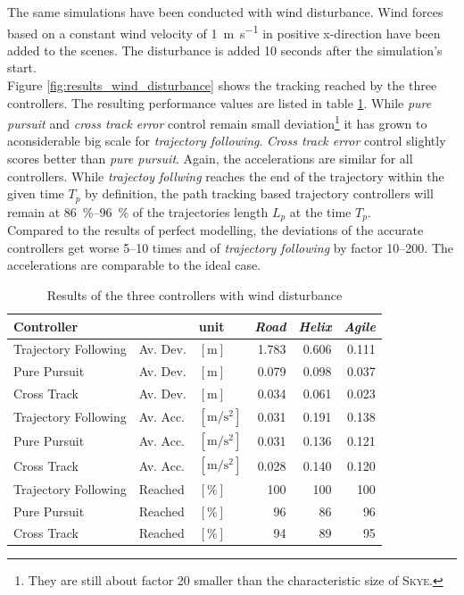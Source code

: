 The same simulations have been conducted with wind disturbance. Wind forces based on a constant wind velocity of \SI{1}{\meter\per\second} in positive x-direction have been added to the scenes. The disturbance is added 10 seconds after the simulation's start. \\
Figure \ref{fig:results_wind_disturbance} shows the tracking reached by the three controllers. The resulting performance values are listed in table \ref{tab:results_wind_disturbance}. While \textit{pure pursuit} and \textit{cross track error} control remain small deviation\footnote{They are still about factor 20 smaller than the characteristic size of \textsc{Skye}.} it has grown to aconsiderable big scale for \textit{trajectory following}. \textit{Cross track error} control slightly scores better than \textit{pure pursuit}. Again, the accelerations are similar for all controllers. While \textit{trajectoy follwing} reaches the end of the trajectory within the given time $T_p$ by definition, the path tracking based trajectory controllers will remain at \SIrange{86}{96}{\percent} of the trajectories length $L_p$ at the time $T_p$. \\
Compared to the results of perfect modelling, the deviations of the accurate controllers get worse \numrange{5}{10} times and of \textit{trajectory following} by factor \numrange{10}{200}. The accelerations are comparable to the ideal case. 

\begin{table}[h]
\begin{center}
 \begin{tabular}{lll|rrr}
 \hline
 Controller &   & unit & \textit{Road} & \textit{Helix} & \textit{Agile} \\ \hline \hline
 Trajectory Following & Av. Dev. & $[\si{\meter}]$ & 1.783 & 0.606 & 0.111 \\
 Pure Pursuit         & Av. Dev. & $[\si{\meter}]$ & 0.079 & 0.098 & 0.037 \\
 Cross Track          & Av. Dev. & $[\si{\meter}]$ & 0.034 & 0.061 & 0.023 \\

 Trajectory Following & Av. Acc. & $[\si{\meter\per\square\second}]$ & 0.031 & 0.191 & 0.138 \\
 Pure Pursuit         & Av. Acc. & $[\si{\meter\per\square\second}]$ & 0.031 & 0.136 & 0.121 \\
 Cross Track          & Av. Acc. & $[\si{\meter\per\square\second}]$ & 0.028 & 0.140 & 0.120 \\
 
 Trajectory Following & Reached & $[\si{\percent}]$ & 100 & 100 & 100 \\
 Pure Pursuit         & Reached & $[\si{\percent}]$ &  96 &  86 &  96 \\
 Cross Track          & Reached & $[\si{\percent}]$ &  94 &  89 &  95 \\
 \hline
 \end{tabular}
 \caption{Results of the three controllers with wind disturbance}\vspace{1px}
 \label{tab:results_wind_disturbance}
\end{center}
\end{table}


